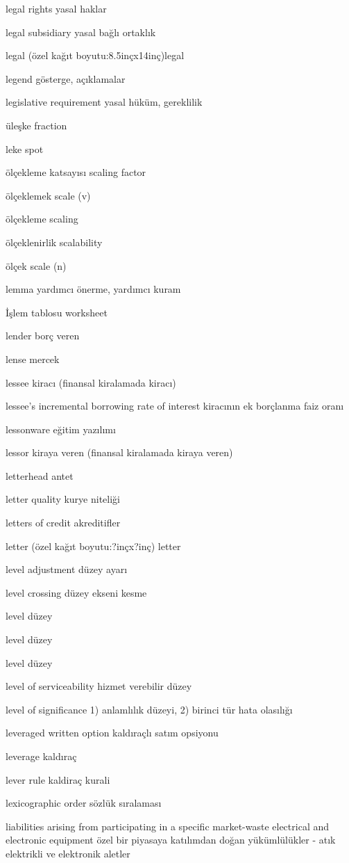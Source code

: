 \documentclass[12pt,fleqn]{article}\usepackage{../../common}
\begin{document}
legal rights yasal haklar

legal subsidiary yasal bağlı ortaklık

legal (özel kağıt boyutu:8.5inçx14inç)legal

legend gösterge, açıklamalar

legislative requirement yasal hüküm, gereklilik

üleşke fraction

leke spot

ölçekleme katsayısı scaling factor

ölçeklemek scale (v)

ölçekleme scaling

ölçeklenirlik scalability

ölçek scale (n)

lemma yardımcı önerme, yardımcı kuram

İşlem tablosu worksheet

lender borç veren

lense mercek

lessee kiracı (finansal kiralamada kiracı)

lessee's incremental borrowing rate of interest kiracının ek borçlanma faiz oranı

lessonware eğitim yazılımı

lessor kiraya veren (finansal kiralamada kiraya veren)

letterhead antet

letter quality kurye niteliği

letters of credit akreditifler

letter (özel kağıt boyutu:?inçx?inç) letter

level adjustment düzey ayarı

level crossing düzey ekseni kesme

level düzey

level düzey

level düzey

level of serviceability hizmet verebilir düzey

level of significance 1) anlamlılık düzeyi, 2) birinci tür hata olasılığı

leveraged written option kaldıraçlı satım opsiyonu

leverage kaldıraç

lever rule kaldiraç kurali

lexicographic order sözlük sıralaması

liabilities arising from participating in a specific market-waste electrical and electronic equipment özel bir piyasaya katılımdan doğan yükümlülükler - atık elektrikli ve elektronik aletler
\end{document}
